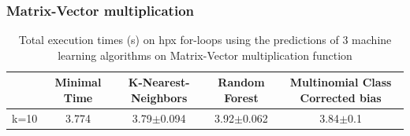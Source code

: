 \subsubsection{Matrix-Vector multiplication}

\begin{table}[h]
	\centering
	\caption{Total execution times (s) on hpx for-loops using the predictions of 3 machine learning algorithms on Matrix-Vector multiplication function}
	\label{my-label}
	\begin{tabular}{|c|c|c|c|c|}
		\hline
		& Minimal Time&K-Nearest-Neighbors & Random Forest &Multinomial Class Corrected bias\\ \hline
		k=10  &3.774&
		3.79$\pm$0.094       & 3.92$\pm$0.062&3.84$\pm$0.1 \\ \hline
	\end{tabular}
\end{table}

